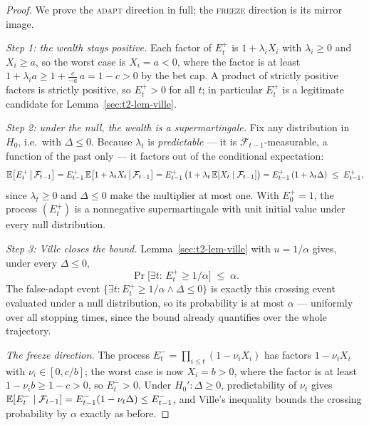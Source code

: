 \begin{proof}
We prove the \textsc{adapt} direction in full; the \textsc{freeze} direction is its
mirror image.

\emph{Step 1: the wealth stays positive.} Each factor of $E^+_t$ is
$1+\lambda_iX_i$ with $\lambda_i\ge0$ and $X_i\ge a$, so the worst case is $X_i=a<0$,
where the factor is at least $1+\lambda_ia\ge1+\tfrac{c}{-a}\,a=1-c>0$ by the bet cap.
A product of strictly positive factors is strictly positive, so $E^+_t>0$ for all $t$;
in particular $E^+_t$ is a legitimate candidate for Lemma~\ref{sec:t2-lem-ville}.

\emph{Step 2: under the null, the wealth is a supermartingale.} Fix any distribution in
$H_0$, i.e.\ with $\Delta\le0$. Because $\lambda_t$ is \emph{predictable} --- it is
$\mathcal F_{t-1}$-measurable, a function of the past only --- it factors out of the
conditional expectation:
\[
\mathbb{E}\bigl[E^+_t\,\big|\,\mathcal F_{t-1}\bigr]
=E^+_{t-1}\,\mathbb{E}\bigl[1+\lambda_tX_t\,\big|\,\mathcal F_{t-1}\bigr]
=E^+_{t-1}\,\bigl(1+\lambda_t\,\mathbb{E}[X_t\mid\mathcal F_{t-1}]\bigr)
=E^+_{t-1}\,(1+\lambda_t\Delta)
\;\le\;E^+_{t-1},
\]
since $\lambda_t\ge0$ and $\Delta\le0$ make the multiplier at most one. With
$E^+_0=1$, the process $(E^+_t)$ is a nonnegative supermartingale with unit initial
value under every null distribution.

\emph{Step 3: Ville closes the bound.} Lemma~\ref{sec:t2-lem-ville} with $u=1/\alpha$
gives, under every $\Delta\le0$,
\[
\Pr\bigl[\exists t:\,E^+_t\ge1/\alpha\bigr]\;\le\;\alpha .
\]
The false-adapt event $\{\exists t:E^+_t\ge1/\alpha\wedge\Delta\le0\}$ is exactly this
crossing event evaluated under a null distribution, so its probability is at most
$\alpha$ --- uniformly over all stopping times, since the bound already quantifies over
the whole trajectory.

\emph{The freeze direction.} The process $E^-_t=\prod_{i\le t}(1-\nu_iX_i)$ has factors
$1-\nu_iX_i$ with $\nu_i\in[0,c/b]$; the worst case is now $X_i=b>0$, where the factor
is at least $1-\nu_ib\ge1-c>0$, so $E^-_t>0$. Under $H_0':\Delta\ge0$, predictability
of $\nu_t$ gives
$\mathbb{E}[E^-_t\mid\mathcal F_{t-1}]=E^-_{t-1}(1-\nu_t\Delta)\le E^-_{t-1}$, and Ville's
inequality bounds the crossing probability by $\alpha$ exactly as before. \qedhere
\end{proof}

